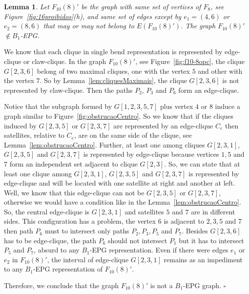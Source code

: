 \documentclass[9pt]{entcs}
\newtheorem{lema}{Lemma}[section]
\begin{document}
% 

\begin{lema}\label{lem:F10-8opcIsNotB1EPG}
Let $F_{10}(8)'$ be the graph with same set of vertices of $F_{8}$, see Figure~\ref{fig:16proibidos}(h), and same set of edges except by $e_1=(4,6)$ or   $e_2=(8,6)$  that may or may not belong to $E(F_{10}(8)')$. The graph $F_{10}(8)'$  $\notin B_1$-EPG. 
\end{lema}

\begin{pf}
We know that each clique in single bend representation is represented by edge-clique or claw-clique. In the graph $F_{10}(8)'$, see Figure~\ref{fig:f10-8opc}, the clique $G[2,3,6]$ belong of two maximal cliques, one with the vertex $5$ and other with the vertex $7$. So by Lemma~\ref{lem:cliquesMaximais}, the clique $G[2,3,6]$ is not represented by claw-clique. Then the paths $P_{2}$, $P_{3}$ and $P_{6}$ form  an edge-clique.

Notice that the subgraph formed by $G[1,2,3,5,7]$ plus vertex $4$ or $8$ induce a graph similar to Figure~\ref{fig:obstrucaoCentro}. So we know that if the cliques induced by $G[2,3,5]$ or $G[2,3,7]$ are represented by an edge-clique $C_e$ then satellites, relative to $C_e$, are on the same side of the clique, see Lemma~\ref{lem:obstrucaoCentro}. Further, at least one among cliques $G[2,3,1]$, $G[2,3,5]$ and $G[2,3,7]$  is represented by edge-clique because vertices $1,5$ and $7$ form an independent set adjacent to clique $G[2, 3]$. So, we can state that at least one clique among $G[2,3,1]$, $G[2,3,5]$ and $G[2,3,7]$ is represented by edge-clique and will be located with one satellite at right and another at left. Well, we know that this edge-clique can not be $G[2,3,5]$ or $G[2,3,7]$, otherwise we would have a condition like in the Lemma~\ref{lem:obstrucaoCentro}. So, the central edge-clique is $G[2,3,1]$ and satellites $5$ and $7$ are in different sides. This configuration has a problem, the vertex $6$ is adjacent to $2, 3, 5$ and $7$ then path $P_6$ must to intersect only paths $P_2, P_3, P_5$ and $P_7$. Besides $G[2,3,6]$ has to be edge-clique, the path $P_6$  should not intersect $P_1$ but it has to intersect $P_5$ and $P_7$, absurd to any $B_1$-EPG representation.  Even if there were edges $e_1$ or $e_2$ in $F_{10}(8)'$, the interval of edge-clique $G[2,3,1]$ remains as an impediment to any $B_1$-EPG representation of $F_{10}(8)'$.

Therefore, we conclude that the graph $F_{10}(8)'$ is not a $B_1$-EPG graph.
 $\square$\end{pf} 
\end{document}
